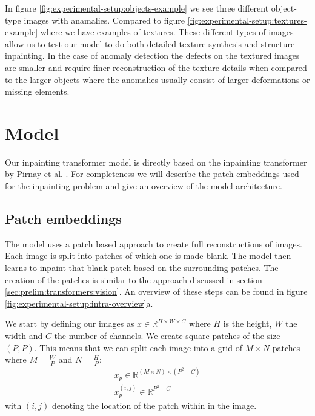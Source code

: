 In figure \ref{fig:experimental-setup:objects-example} we see three different object-type images with anamalies. Compared to figure \ref{fig:experimental-setup:textures-example} where we have examples of textures. These different types of images allow us to test our model to do both detailed texture synthesis and structure inpainting. In the case of anomaly detection the defects on the textured images are smaller and require finer reconstruction of the texture details when compared to the larger objects where the anomalies usually consist of larger deformations or missing elements.

\section{Model}
\label{sec:experimental-setup:model}

Our inpainting transformer model is directly based on the inpainting transformer by Pirnay et al. \cite{pirnay_inpainting_2021}. For completeness we will describe the patch embeddings used for the inpainting problem and give an overview of the model architecture.

\subsection{Patch embeddings}
\label{subsec:experimental-setup:patch-embeddings}

The model uses a patch based approach to create full reconstructions of images. Each image is split into patches of which one is made blank. The model then learns to inpaint that blank patch based on the surrounding patches. The creation of the patches is similar to the approach discussed in section \ref{sec:prelim:transformers:vision}. An overview of these steps can be found in figure \ref{fig:experimental-setup:intra-overview}a.

We start by defining our images as $x \in \mathbb{R}^{H \times W \times C}$ where $H$ is the height, $W$ the width and $C$ the number of channels. We create square patches of the size $(P, P)$. This means that we can split each image into a grid of $M \times N$ patches where $M = \frac{W}{P}$ and $N = \frac{H}{P}$:
%
\begin{align}
    x_p \in \mathbb{R}^{(M \times N) \times (P^2 \; \cdot \; C)}\\
    x_p^{(i,j)} \in \mathbb{R}^{P^2 \; \cdot \; C}
\end{align}
%
with $(i, j)$ denoting the location of the patch within in the image.

